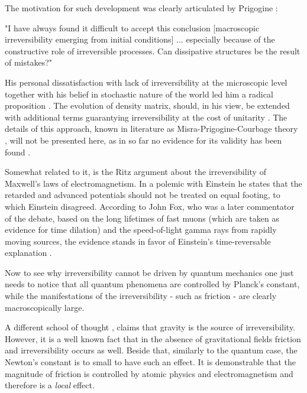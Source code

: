 \documentclass[a4paper,12pt]{article}
\begin{document}
The motivation for such development was clearly articulated by Prigogine \cite{Prigogine:1978kz}:
\begin{displayquote}
"I have always found it difficult to accept this conclusion [macroscopic irreversibility emerging from initial conditions] {...} especially because of the constructive role of irreversible processes. Can dissipative structures be the result of mistakes?"
\end{displayquote}

His personal dissatisfaction with lack of irreversibility at the microscopic level together with his belief in stochastic nature of the world led him a radical proposition \cite{Gustafson:2004kx}.
The evolution of density matrix, should, in his view, be extended with additional terms guarantying irreversibility at the cost of unitarity \cite{Prigogine:1978kz}.
The details of this approach, known in literature as Misra-Prigogine-Courbage theory \cite{Courbage:1983eo}, will not be presented here, as in so far no evidence for its validity has been found \cite{Bricmont:7zJsfTpK}.

Somewhat related to it, is the Ritz argument about the irreversibility of Maxwell's laws of electromagnetism. In a polemic with Einstein he states that the retarded and advanced potentials should not be treated on equal footing, to which Einstein disagreed. 
According to John Fox, who was a later commentator of the debate, based on the long lifetimes of fast muons (which are taken as evidence for time dilation) and the speed-of-light gamma rays from rapidly moving sources, the evidence stands in favor of Einstein's time-reversable explanation \cite{Fox:1965bg}.

Now to see why irreversibility cannot be driven by quantum mechanics one just needs to notice that all quantum phenomena are controlled by Planck's constant, while the manifestations of the irreversibility - such as friction - are clearly macroscopically large. %

A different school of thought \cite{KIEFER2005, Barbour:2014hq}, %
claims that gravity is the source of irreversibility. However, it is a well known fact that in the absence of gravitational fields friction and irreversibility occurs as well. Beside that, similarly to the quantum case, the Newton's constant is to small to have such an effect. It is demonstrable that the magnitude of friction is controlled by atomic physics and electromagnetism and therefore is a \textit{local} effect. 
\end{document}
